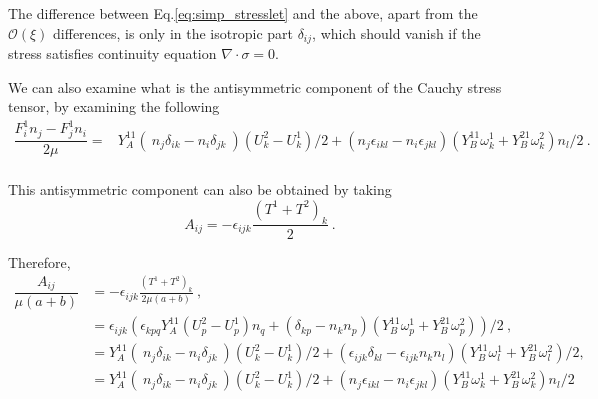 \documentclass[reprint, amsmath,amssymb,aps,pre,onecolumn,notitlepage%
]{revtex4-1}
\begin{document}
The difference between Eq.\eqref{eq:simp_stresslet} and the above, apart from the $\mathcal{O}(\xi)$ differences, is only in the isotropic part $\delta_{ij}$, which should vanish if the stress satisfies continuity equation $\nabla\cdot\sigma=0$.

We can also examine what is the antisymmetric component of the Cauchy stress tensor, by examining the following
\begin{equation}
\begin{split}
	\dfrac{F^1_i n_j-F^1_j n_i}{2 \mu}=& Y_A^{11} (\ n_j \delta_{ik}-n_i \delta_{jk}\ )(U^2_k-U^1_k)/2 +  ( n_j\epsilon_{ikl}-n_i\epsilon_{jkl} ) \left(Y_B^{11}\omega_k^1+Y_B^{21}\omega_k^2\right) n_l/2  \ .\\
\end{split}
\end{equation}

This antisymmetric component can also be obtained by taking
\begin{equation}
	A_{ij}=-\epsilon_{ijk} \dfrac{(T^1+T^2)_k}{2} \ .
\end{equation}

Therefore, 
\begin{equation}
	\begin{split}
	\dfrac{A_{ij}}{\mu (a+b)}&=-\epsilon_{ijk} \frac{(T^1+T^2)_k}{2 \mu (a+b)}\ , \\
	&= \epsilon_{ijk} \left( \epsilon_{kpq}  Y_A^{11} (U^2_p-U^1_p)n_q +( \delta_{kp}-n_kn_p)(Y_B^{11}\omega_p^1+Y_B^{21}\omega_p^2 )\right)/2\ ,\\
	&= Y_A^{11} (\ n_j \delta_{ik}-n_i \delta_{jk}\ )(U^2_k-U^1_k)/2 +( \epsilon_{ijk} \delta_{kl} -\epsilon_{ijk} n_kn_l)(Y_B^{11}\omega_l^1+Y_B^{21}\omega_l^2 )/2, \\
	&= Y_A^{11} (\ n_j \delta_{ik}-n_i \delta_{jk}\ )(U^2_k-U^1_k)/2 +( n_j\epsilon_{ikl}-n_i\epsilon_{jkl} )(Y_B^{11}\omega_k^1+Y_B^{21}\omega_k^2 ) n_l/2
\end{split}
\end{equation}



\end{document}
